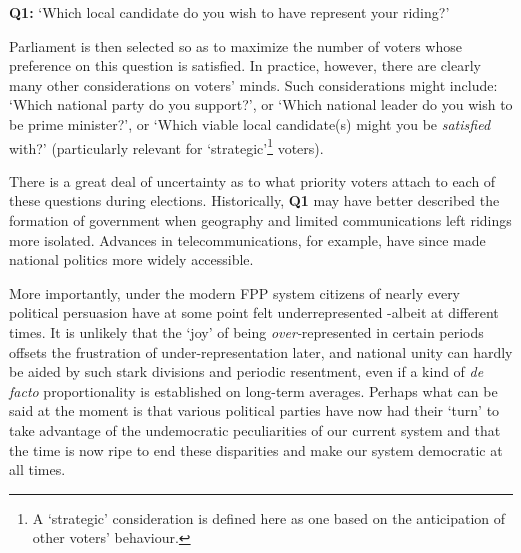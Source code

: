 \documentclass[DIV=calc, paper=a4, fontsize=11pt, twocolumn]{scrartcl}	 %
\begin{document}
\begin{tcolorbox}[colback=white!5!white,colframe=blue!55!black]
{\textbf{Q1:} } `Which local candidate do you wish to have represent your riding?'
\end{tcolorbox}

Parliament is then selected so as to maximize the number of voters whose preference on this question is satisfied.
In practice, however, there are clearly many other considerations on voters' minds. 
Such considerations might include: `Which national party do you support?', or `Which national leader do you wish to be prime minister?', or `Which viable local candidate(s) might you be \emph{satisfied} with?' (particularly relevant for `strategic'\footnote{A `strategic'  consideration is defined here as one based on the anticipation of other voters' behaviour.} voters). 

There is a great deal of uncertainty as to what priority voters attach to each of these questions during elections. Historically, \textbf{Q1} may have better described the formation of government when geography and limited communications left ridings more isolated.
Advances in telecommunications, for example, have since made national politics more widely accessible. 



More importantly, under the modern FPP system citizens of nearly every political persuasion have at some point felt underrepresented \--albeit at different times. It is unlikely that the `joy' of being \emph{over-}represented in certain periods offsets the frustration of under-representation later, and
 national unity can hardly be aided by such stark divisions and periodic resentment, even if a kind of \emph{ de facto} proportionality is established on long-term averages. 
Perhaps what can be said at the moment is that various political parties have now had their `turn' to take advantage of the undemocratic peculiarities of our current system and that the time is now ripe to end these disparities and make our system democratic at all times. 
\end{document}
